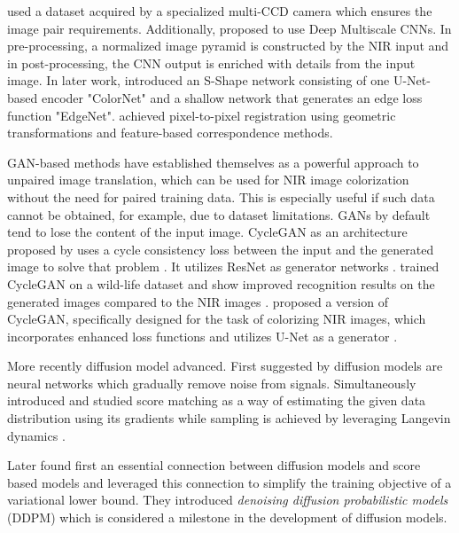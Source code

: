 \textcite{limmer} used a dataset acquired by a specialized multi-CCD camera which ensures the image pair requirements.
Additionally, \textcite{limmer} proposed to use Deep Multiscale CNNs.
In pre-processing, a normalized image pyramid is constructed by the NIR input and in post-processing, the CNN output is enriched with details from the input image.
In later work, \textcite{s-shape} introduced an S-Shape network consisting of one U-Net-based encoder "ColorNet" and a shallow network that generates an edge loss function "EdgeNet".
\textcite{s-shape} achieved pixel-to-pixel registration using geometric transformations and feature-based correspondence methods.

GAN-based methods have established themselves as a powerful approach to unpaired image translation, which can be used for NIR image colorization without the need for paired training data.
This is especially useful if such data cannot be obtained, for example, due to dataset limitations.
GANs by default tend to lose the content of the input image. CycleGAN as an architecture proposed by  uses a cycle consistency loss between the input and the generated image to solve that problem \cite{cyclegan-original}.
It utilizes ResNet \parencite{resnet} as generator networks \parencite{cyclegan-original}.
 trained CycleGAN on a wild-life dataset and show improved recognition results on the generated images compared to the NIR images \parencite{cyclegan-camera-traps}.
 proposed a version of CycleGAN, specifically designed for the task of colorizing NIR images, which incorporates enhanced loss functions and utilizes U-Net as a generator \parencite{mehri}.

More recently diffusion model advanced. 
First suggested by \textcite{deep-unsupervised-learning-using-nonequilibrium-thermodynamics} diffusion models are neural networks which gradually remove noise from signals. 
Simultaneously \textcite{generative-modeling-by-estimating-gradients-of-the-data-distribution} introduced and studied score matching as a way of estimating the given data distribution using its gradients while sampling is achieved by leveraging Langevin dynamics \parencite{langevin-dynamics}.

Later \textcite{ddpm} found first an essential connection between diffusion models and score based models and leveraged this connection to simplify the training objective of a variational lower bound.
They introduced \textit{denoising diffusion probabilistic models} (DDPM) which is considered a milestone in the development of diffusion models.

